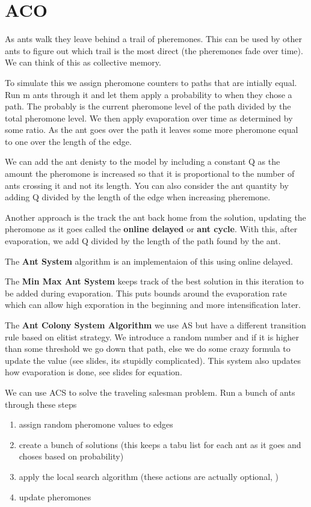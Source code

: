 \documentclass[12pt]{article}
\begin{document}
\section{ACO} %
\label{sec:aco}
As ants walk they leave behind a trail of pheremones. This can be used by other ants to figure out which trail is the most direct (the pheremones fade over time). We can think of this as collective memory.

To simulate this we assign pheromone counters to paths that are intially equal. Run m ants through it and let them apply a probability to when they chose a path. The probably is the current pheromone level of the path divided by the total pheromone level. We then apply evaporation over time as determined by some ratio. As the ant goes over the path it leaves some more pheromone equal to one over the length of the edge. 

We can add the ant denisty to the model by including a constant Q as the amount the pheromone is increased so that it is proportional to the number of ants crossing it and not its length. You can also consider the ant quantity by adding Q divided by the length of the edge when increasing pheremone.

Another approach is the track the ant back home from the solution, updating the pheromone as it goes called the \textbf{online delayed} or \textbf{ant cycle}.  With this, after evaporation, we add Q divided by the length of the path found by the ant. 

The \textbf{Ant System} algorithm is an implementaion of this using online delayed. 

The \textbf{Min Max Ant System} keeps track of the best solution in this iteration to be added during evaporation. This puts bounds around the evaporation rate which can allow high exporation in the beginning and more intensification later.

The \textbf{Ant Colony System Algorithm} we use AS but have a different transition rule based on elitist strategy. We introduce a random number and if it is higher than some threshold we go down that path, else we do some crazy formula to update the value (see slides, its stupidly complicated). This system also updates how evaporation is done, see slides for equation.

We can use ACS to solve the traveling salesman problem. Run a bunch of ants through these steps
\begin{enumerate}
	\item assign random pheromone values to edges
	\item create a bunch of solutions (this keeps a tabu list for each ant as it goes and choses based on probability)
	\item apply the local search algorithm (these actions are actually optional, )
	\item update pheromones
\end{enumerate}
\end{document}
